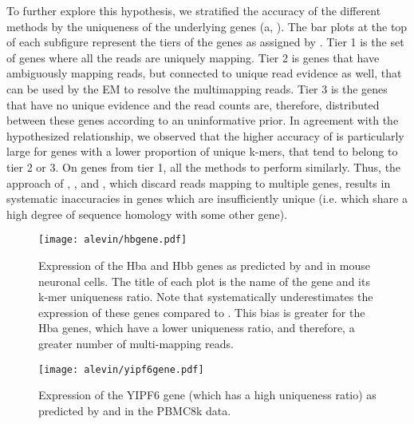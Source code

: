 To further explore this hypothesis, we stratified the accuracy of the different methods by the uniqueness of the underlying genes (a, ). The bar plots at the top of each subfigure represent the tiers of the genes as assigned by \alevin. Tier 1 is the set of genes where all the reads are uniquely mapping. Tier 2 is genes that have ambiguously mapping reads, but connected to unique read evidence as well, that can be used by the EM to resolve the multimapping reads. Tier 3 is the genes that have no unique evidence and the read counts are, therefore, distributed between these genes according to an uninformative prior. In agreement with the hypothesized relationship, we observed that the higher accuracy of \alevin is particularly large for genes with a lower proportion of unique k-mers, that tend to belong to tier 2 or 3. On genes from tier 1, all the methods to perform similarly. Thus, the approach of \cellr, \dropest, and \naive, which discard reads mapping to multiple genes, results in systematic inaccuracies in genes which are insufficiently unique (i.e. which share a high degree of sequence homology with some other gene). 

\begin{figure}
  \texttt{[image: alevin/hbgene.pdf]}
  \caption{Expression of the Hba and Hbb genes as predicted by \alevin and \cellr in mouse neuronal cells. The title of each plot is the name of the gene and its k-mer uniqueness ratio. Note that \cellr systematically underestimates the expression of these genes compared to \alevin. This bias is greater for the Hba genes, which have a lower uniqueness ratio, and therefore, a greater number of multi-mapping reads.}
  \label{fig:hbgene}
\end{figure}

\begin{figure}
    \centering
  \texttt{[image: alevin/yipf6gene.pdf]}
  \caption{Expression of the YIPF6 gene (which has a high uniqueness ratio) as predicted by \alevin and \cellr in the PBMC8k data.}
  \label{fig:yipgene}
\end{figure}

